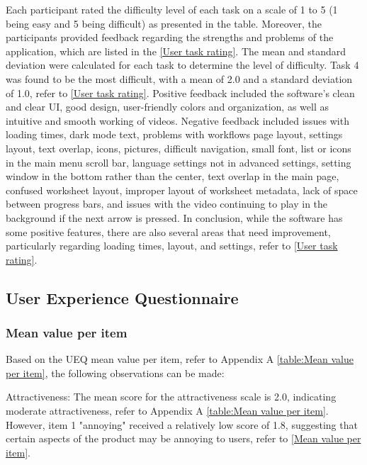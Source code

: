 \documentclass[conference,onecolumn]{IEEEtran}
\begin{document}
            Each participant rated the difficulty level of each task on a scale of 1 to 5 (1 being easy and 5 being difficult) as presented in the table. Moreover, the participants provided feedback regarding the strengths and problems of the application, which are listed in the \tablename{ \ref{User task rating}}. The mean and standard deviation were calculated for each task to determine the level of difficulty. Task 4 was found to be the most difficult, with a mean of 2.0 and a standard deviation of 1.0, refer to \tablename{ \ref{User task rating}}. Positive feedback included the software's clean and clear UI, good design, user-friendly colors and organization, as well as intuitive and smooth working of videos. Negative feedback included issues with loading times, dark mode text, problems with workflows page layout, settings layout, text overlap, icons, pictures, difficult navigation, small font, list or icons in the main menu scroll bar, language settings not in advanced settings, setting window in the bottom rather than the center, text overlap in the main page, confused worksheet layout, improper layout of worksheet metadata, lack of space between progress bars, and issues with the video continuing to play in the background if the next arrow is pressed. In conclusion, while the software has some positive features, there are also several areas that need improvement, particularly regarding loading times, layout, and settings, refer to \tablename{ \ref{User task rating}}.

    \subsection{User Experience Questionnaire}

        \subsubsection{Mean value per item}\hfill

            Based on the UEQ mean value per item, refer to Appendix A \tablename{ \ref{table:Mean value per item}}, the following observations can be made:
            
            Attractiveness: The mean score for the attractiveness scale is 2.0, indicating moderate attractiveness, refer to Appendix A \tablename{ \ref{table:Mean value per item}}. However, item 1 "annoying" received a relatively low score of 1.8, suggesting that certain aspects of the product may be annoying to users, refer to \figurename{\ref{Mean value per item}}.
            
\end{document}
